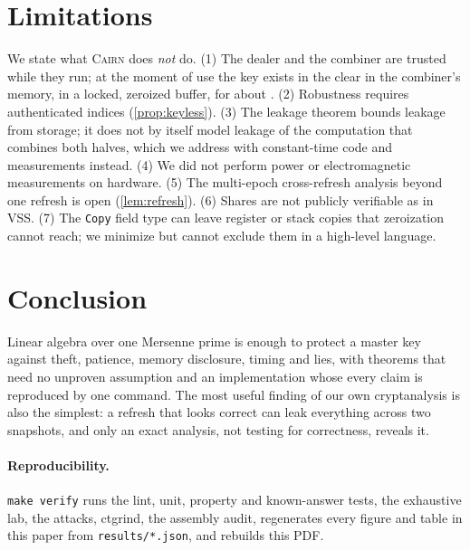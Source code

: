 \documentclass[10.5pt,a4paper]{article}
\theoremstyle{plain}
\theoremstyle{definition}
\newcommand{\cairn}{\textsc{Cairn}}
\newcommand{\code}[1]{\texttt{#1}}
\begin{document}
\section{Limitations}\label{sec:limits}
We state what \cairn{} does \emph{not} do. (1) The dealer and the combiner are trusted while they run; at the moment of use the key exists in the clear in the combiner's memory, in a locked, zeroized buffer, for about \BenchCombine{}. (2) Robustness requires authenticated indices (\cref{prop:keyless}). (3) The leakage theorem bounds leakage from storage; it does not by itself model leakage of the computation that combines both halves, which we address with constant-time code and measurements instead. (4) We did not perform power or electromagnetic measurements on hardware. (5) The multi-epoch cross-refresh analysis beyond one refresh is open (\cref{lem:refresh}). (6) Shares are not publicly verifiable as in VSS. (7) The \code{Copy} field type can leave register or stack copies that zeroization cannot reach; we minimize but cannot exclude them in a high-level language.

\section{Conclusion}
Linear algebra over one Mersenne prime is enough to protect a master key against theft, patience, memory disclosure, timing and lies, with theorems that need no unproven assumption and an implementation whose every claim is reproduced by one command. The most useful finding of our own cryptanalysis is also the simplest: a refresh that looks correct can leak everything across two snapshots, and only an exact analysis, not testing for correctness, reveals it.

\paragraph{Reproducibility.} \code{make verify} runs the lint, unit, property and known-answer tests, the exhaustive lab, the attacks, ctgrind, the assembly audit, regenerates every figure and table in this paper from \code{results/*.json}, and rebuilds this PDF.
\end{document}
